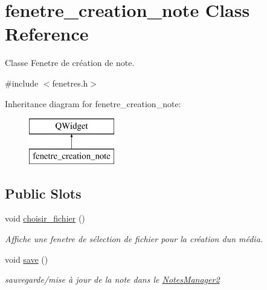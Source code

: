 \hypertarget{classfenetre__creation__note}{}\section{fenetre\+\_\+creation\+\_\+note Class Reference}
\label{classfenetre__creation__note}


Classe Fenetre de création de note.  




{\ttfamily \#include $<$fenetres.\+h$>$}

Inheritance diagram for fenetre\+\_\+creation\+\_\+note\+:\begin{figure}[H]
\begin{center}
\leavevmode
\includegraphics[height=2.000000cm]{classfenetre__creation__note}
\end{center}
\end{figure}
\subsection*{Public Slots}
\begin{DoxyCompactItemize}
\item 
\mbox{\label{classfenetre__creation__note_aca59451560c2499954b64ed21db04eb2}} 
void \hyperlink{classfenetre__creation__note_aca59451560c2499954b64ed21db04eb2}{choisir\+\_\+fichier} ()
\begin{DoxyCompactList}\small\item\em Affiche une fenetre de sélection de fichier pour la création d\textquotesingle{}un média. \end{DoxyCompactList}\item 
void \hyperlink{classfenetre__creation__note_a148abe3a7d3ba11210f456d4cddce196}{save} ()
\begin{DoxyCompactList}\small\item\em sauvegarde/mise à jour de la note dans le \hyperlink{class_notes_manager2}{Notes\+Manager2} \end{DoxyCompactList}\end{DoxyCompactItemize}
